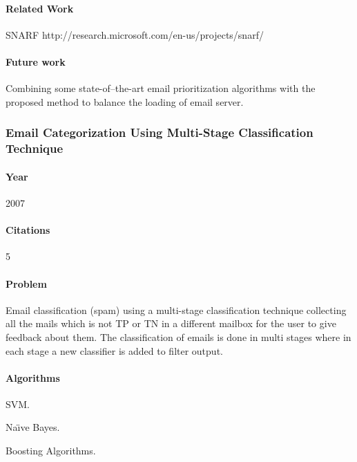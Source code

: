 \documentclass[12pt]{article}
\newenvironment{my_itemize}
{\begin{itemize}
  \setlength{\itemsep}{0cm}
  \setlength{\parskip}{0cm}}
{\end{itemize}}
\begin{document}
\paragraph{Related Work}
\begin{my_itemize}
  \item SNARF http://research.microsoft.com/en-us/projects/snarf/
\end{my_itemize}

\paragraph{Future work}
\begin{my_itemize}
  \item Combining some state-of–the-art email prioritization algorithms with the 
	proposed method to balance the loading of email server.
\end{my_itemize}


\subsubsection{Email Categorization Using Multi-Stage Classification Technique \cite{MD07}}

\paragraph{Year} 2007
\paragraph{Citations} 5

\paragraph{Problem}
\begin{my_itemize}
  \item Email classification (spam) using a multi-stage classification technique 
	collecting all the mails which is not TP or TN in a different mailbox for
	the user to give feedback about them. The classification of emails is done 
	in multi stages where in each stage a new classifier is added to filter output.
\end{my_itemize}

\paragraph{Algorithms}
\begin{my_itemize}
  \item SVM.
  \item Na\"{\i}ve Bayes.
  \item Boosting Algorithms.
\end{my_itemize}
\end{document}
